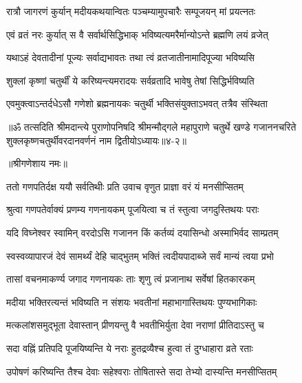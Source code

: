 \twolineshloka
{रात्रौ जागरणं कुर्यान् मदीयकथयान्वितः}
{पञ्चम्यामुपचारैः सम्पूजयन् मां प्रयत्नतः} %

\twolineshloka
{एवं व्रतं नरः कुर्यात् स वै सर्वार्थसिद्धिभाक्}
{भविष्यत्यमरैर्मान्योऽन्ते ब्रह्मणि लयं व्रजेत्} %

\twolineshloka
{यथाऽहं देवतादीनां पूज्यः सर्वाद्यभावतः}
{तथा त्वं व्रतजातीनामादिपूज्या भविष्यसि} %

\twolineshloka
{शुक्लां कृष्णां चतुर्थीं ये करिष्यन्त्यमरादयः}
{सर्वव्रतादि भावेषु तेषां सिद्धिर्भविष्यति} %

\twolineshloka
{एवमुक्त्वाऽन्तर्दधेऽसौ गणेशो ब्रह्मनायकः}
{चतुर्थी भक्तिसंयुक्ताऽभवत् तत्रैव संस्थिता} %

॥ॐ तत्सदिति श्रीमदान्त्ये पुराणोपनिषदि श्रीमन्मौद्गले महापुराणे चतुर्थे खण्डे गजाननचरिते शुक्लकृष्णचतुर्थीवरदानवर्णनं नाम द्वितीयोऽध्यायः॥४-२॥


\label{sec:pratipadadivrata-varnanam}

\centerline{॥श्रीगणेशाय नमः॥}


\twolineshloka
{ततो गणपतिर्दक्ष ययौ सर्वतिथीः प्रति}
{उवाच वृणुत प्राज्ञा वरं यं मनसीप्सितम्} %

\twolineshloka
{श्रुत्वा गणपतेर्वाक्यं प्रणम्य गणनायकम्}
{पूजयित्वा च तं स्तुत्वा जगदुस्तिथयः पराः} %


\twolineshloka
{यदि विघ्नेश्वर स्वामिन् वरदोऽसि गजानन}
{किं कर्तव्यं दयासिन्धो अस्माभिर्वद साम्प्रतम्} %

\twolineshloka
{स्वस्वव्यापारजं देवं सामर्थ्यं देहि चाद्भुतम्}
{भक्तिं त्वदीयपादाब्जे सर्वं मान्यं त्वया प्रभो} %

\twolineshloka
{तासां वचनमाकर्ण्य जगाद गणनायकः}
{ताः श‍ृणु त्वं प्रजानाथ सर्वेषां हितकारकम्} %


\twolineshloka
{मदीया भक्तिरत्यन्तं भविष्यति न संशयः}
{भवतीनां महाभागास्तिथयः पुण्यभागिकाः} %

\twolineshloka
{मत्कलांशसमुद्भूता देवास्तान् प्रीणयन्तु वै}
{भवतीभिर्युता देवा नराणां प्रीतिदाऽस्तु च} %

\twolineshloka
{सदा वह्निं प्रतिपदि पूजयिष्यन्ति ये नराः}
{हुतद्रव्यैश्च हुत्वा तं दुग्धाहारा व्रते रताः} %

\twolineshloka
{उपोषणं करिष्यन्ति तैश्च देवाः सहेश्वराः}
{तोषितास्ते सदा तेभ्यो दास्यन्ति मनसीप्सितम्} %

